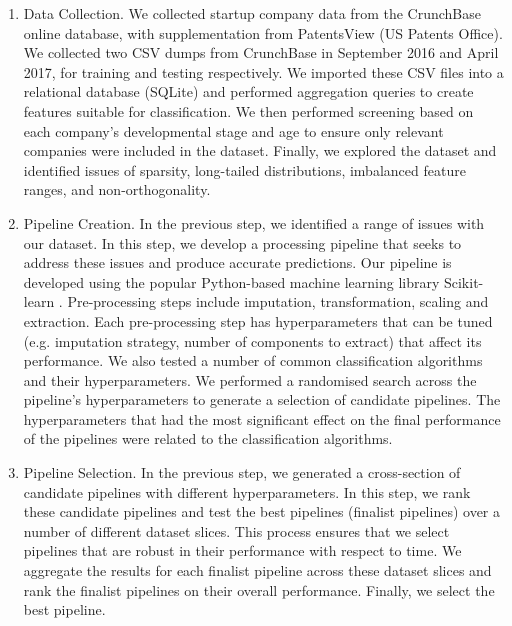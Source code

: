 \documentclass[../thesis/thesis.tex]{subfiles}
\begin{document}
\begin{enumerate}

\item Data Collection. We collected startup company data from the CrunchBase online database, with supplementation from PatentsView (US Patents Office). We collected two CSV dumps from CrunchBase in September 2016 and April 2017, for training and testing respectively. We imported these CSV files into a relational database (SQLite) and performed aggregation queries to create features suitable for classification. We then performed screening based on each company’s developmental stage and age to ensure only relevant companies were included in the dataset. Finally, we explored the dataset and identified issues of sparsity, long-tailed distributions, imbalanced feature ranges, and non-orthogonality.

\item Pipeline Creation. In the previous step, we identified a range of issues with our dataset. In this step, we develop a processing pipeline that seeks to address these issues and produce accurate predictions. Our pipeline is developed using the popular Python-based machine learning library Scikit-learn \cite{pedregosa2011}. Pre-processing steps include imputation, transformation, scaling and extraction. Each pre-processing step has hyperparameters that can be tuned (e.g. imputation strategy, number of components to extract) that affect its performance. We also tested a number of common classification algorithms and their hyperparameters. We performed a randomised search across the pipeline’s hyperparameters to generate a selection of candidate pipelines. The hyperparameters that had the most significant effect on the final performance of the pipelines were related to the classification algorithms.

\item Pipeline Selection. In the previous step, we generated a cross-section of candidate pipelines with different hyperparameters. In this step, we rank these candidate pipelines and test the best pipelines (finalist pipelines) over a number of different dataset slices. This process ensures that we select pipelines that are robust in their performance with respect to time. We aggregate the results for each finalist pipeline across these dataset slices and rank the finalist pipelines on their overall performance. Finally, we select the best pipeline.



\end{enumerate}
\end{document}

